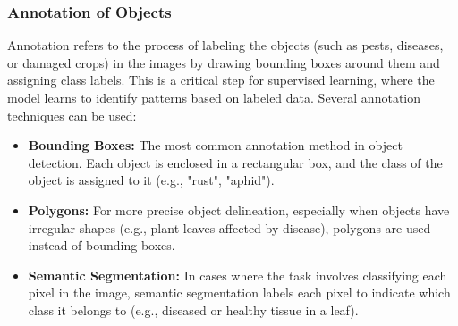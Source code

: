 \subsubsection{Annotation of Objects}
Annotation refers to the process of labeling the objects (such as pests, diseases, or damaged crops) in the images by drawing bounding boxes around them and assigning class labels. This is a critical step for supervised learning, where the model learns to identify patterns based on labeled data. Several annotation techniques can be used:
\begin{itemize}
    \item \textbf{Bounding Boxes:} The most common annotation method in object detection. Each object is enclosed in a rectangular box, and the class of the object is assigned to it (e.g., "rust", "aphid").
    \item \textbf{Polygons:} For more precise object delineation, especially when objects have irregular shapes (e.g., plant leaves affected by disease), polygons are used instead of bounding boxes.
    \item \textbf{Semantic Segmentation:} In cases where the task involves classifying each pixel in the image, semantic segmentation labels each pixel to indicate which class it belongs to (e.g., diseased or healthy tissue in a leaf).
\end{itemize}

